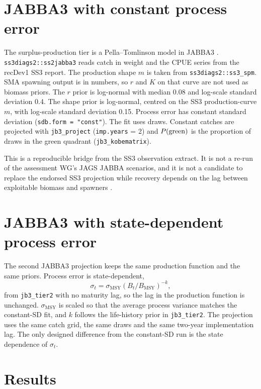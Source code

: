 \documentclass[11pt,a4paper]{article}
\begin{document}


\section{JABBA3 with constant process error}

The surplus-production tier is a Pella--Tomlinson model in JABBA3
\citep{JABBA3,Winker2018}. \texttt{ss3diags2::ss2jabba3} reads catch in
weight and the CPUE series from the recDev1 SS3 report. The production shape
$m$ is taken from \texttt{ss3diags2::ss3\_spm}. SMA spawning output is in
numbers, so $r$ and $K$ on that curve are not used as biomass priors. The
$r$ prior is log-normal with median 0.08 and log-scale standard deviation
0.4. The shape prior is log-normal, centred on the SS3 production-curve $m$,
with log-scale standard deviation 0.15. Process error has constant standard
deviation (\texttt{sdb.form = "const"}). The fit uses \nDraw{} draws. Constant
catches are projected with \texttt{jb3\_project} (\texttt{imp.years} = 2) and
$P(\mathrm{green})$ is the proportion of draws in the green quadrant
(\texttt{jb3\_kobematrix}).

This is a reproducible bridge from the SS3 observation extract. It is not a
re-run of the assessment WG's JAGS JABBA scenarios, and it is not a candidate
to replace the endorsed SS3 projection while recovery depends on the lag
between exploitable biomass and spawners \citep{Winker2020SMA,SharkWG2026}.

\section{JABBA3 with state-dependent process error}

The second JABBA3 projection keeps the same production function and the same
priors. Process error is state-dependent,
\begin{equation}
\sigma_t = \sigma_{\mathrm{MSY}}\left(B_t/B_{\mathrm{MSY}}\right)^{-k},
\end{equation}
from \texttt{jb3\_tier2} with no maturity lag, so the lag in the production
function is unchanged. $\sigma_{\mathrm{MSY}}$ is scaled so that the average
process variance matches the constant-SD fit, and $k$ follows the life-history
prior in \texttt{jb3\_tier2}. The projection uses the same catch grid, the
same \nDraw{} draws and the same two-year implementation lag. The only
designed difference from the constant-SD run is the state dependence of
$\sigma_t$.

\section{Results}
\end{document}

